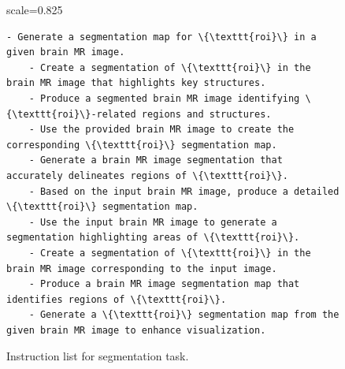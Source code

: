 \begin{figure}[t]
\centering
\begin{adjustbox}{scale=0.825}
\begin{minipage}{1.2\columnwidth}
\begin{Verbatim}[frame=single, numbersep=5pt,
                 commandchars=\\\{\}]
    - Generate a segmentation map for \{\texttt{roi}\} in a given brain MR image.
    - Create a segmentation of \{\texttt{roi}\} in the brain MR image that highlights key structures.
    - Produce a segmented brain MR image identifying \{\texttt{roi}\}-related regions and structures.
    - Use the provided brain MR image to create the corresponding \{\texttt{roi}\} segmentation map.
    - Generate a brain MR image segmentation that accurately delineates regions of \{\texttt{roi}\}.
    - Based on the input brain MR image, produce a detailed \{\texttt{roi}\} segmentation map.
    - Use the input brain MR image to generate a segmentation highlighting areas of \{\texttt{roi}\}.
    - Create a segmentation of \{\texttt{roi}\} in the brain MR image corresponding to the input image.
    - Produce a brain MR image segmentation map that identifies regions of \{\texttt{roi}\}.
    - Generate a \{\texttt{roi}\} segmentation map from the given brain MR image to enhance visualization.
\end{Verbatim}
\end{minipage}
\end{adjustbox}
\centering
\vspace{-7pt}
\caption{Instruction list for segmentation task.}
\label{figF}
\vspace{-3pt}
\end{figure}

